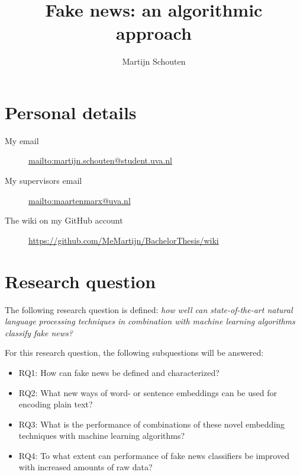 \documentclass[a4paper,pdf]{article} %
\begin{document}
\title{Fake news: an algorithmic approach} %
\author{Martijn Schouten}

\maketitle




\section{Personal details}

\begin{description}
 \item[My email] \url{mailto:martijn.schouten@student.uva.nl }
 \item[My supervisors email] \url{mailto:maartenmarx@uva.nl }
 \item[The wiki on my GitHub account] \url{https://github.com/MeMartijn/BachelorThesis/wiki}
 \end{description} 

\section{Research question}

The following research question is defined: \textit{how well can state-of-the-art natural language processing techniques in combination with machine learning algorithms classify fake news?}

For this research question, the following subquestions will be answered:
\begin{itemize}
  \item RQ1: How can fake news be defined and characterized?
  \item RQ2: What new ways of word- or sentence embeddings can be used for encoding plain text?
  \item RQ3: What is the performance of combinations of these novel embedding techniques with machine learning algorithms?
  \item RQ4: To what extent can performance of fake news classifiers be improved with increased amounts of raw data?
\end{itemize}
\end{document}
